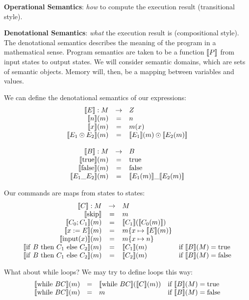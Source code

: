 \textbf{Operational Semantics}: \emph{how} to compute the execution result (transitional style).


\textbf{Denotational Semantics}: \emph{what} the execution result is (compositional style).
The denotational semantics describes the meaning of the program in a mathematical sense.
Program semantics are taken to be a function $\llbracket P \rrbracket$ from input states
to output states. We will consider semantic domains, which are sets of semantic objects.
Memory will, then, be a mapping between variables and values.

We can define the denotational semantics of our expressions:
\[
\begin{array}{rcl}
\llbracket E \rrbracket : M & \to & Z \\
\llbracket n \rrbracket (m) & = & n \\
\llbracket x \rrbracket (m) & = & m(x) \\
\llbracket E_1 \odot E_2 \rrbracket (m) & = & \llbracket E_1 \rrbracket(m) \odot \llbracket E_2 (m) \rrbracket \\
&&\\
\llbracket B \rrbracket : M & \to & B \\
\llbracket \mathrm{true} \rrbracket(m) & = & \mathrm{true} \\
\llbracket \mathrm{false} \rrbracket(m) & = & \mathrm{false} \\
\llbracket E_1 \_ E_2 \rrbracket(m) &=& \llbracket E_1 (m) \rrbracket \_ \llbracket E_2 (m) \rrbracket
\end{array}
\]

Our commands are maps from states to states:
\[
\begin{array}{rcll}
\llbracket C \rrbracket : M & \to & M & \\
\llbracket \mathrm{skip} \rrbracket & = & m & \\
\llbracket C_0 ; C_1 \rrbracket (m) &=& \llbracket C_1 \rrbracket (\llbracket C_0 (m) \rrbracket) & \\
\llbracket x := E \rrbracket (m) &=& m\{x \mapsto \llbracket E \rrbracket(m)\} & \\
\llbracket \mathrm{input}(x) \rrbracket(m) & = & m\{x \mapsto n\} & \\
\llbracket \mathrm{if~} B \mathrm{~then~} C_1 \mathrm{~else~} C_2 \rrbracket (m) & = & \llbracket C_1 \rrbracket (m) & \text{if~} \llbracket B \rrbracket (M) = \mathrm{true} \\
\llbracket \mathrm{if~} B \mathrm{~then~} C_1 \mathrm{~else~} C_2 \rrbracket (m) & = & \llbracket C_2 \rrbracket (m) & \text{if~} \llbracket B \rrbracket (M) = \mathrm{false} \\
\end{array}
\]

What about $\mathrm{while}$ loops? We may try to define loops this way:
\[
\begin{array}{rcll}
\llbracket \mathrm{while~} B C \rrbracket (m) & = & \llbracket \mathrm{while~} B C \rrbracket (\llbracket C \rrbracket (m))  & \text{if~} \llbracket B \rrbracket (M) = \mathrm{true} \\
\llbracket \mathrm{while~} B C \rrbracket (m) & = & m  & \text{if~} \llbracket B \rrbracket (M) = \mathrm{false} \\
\end{array}
\]

